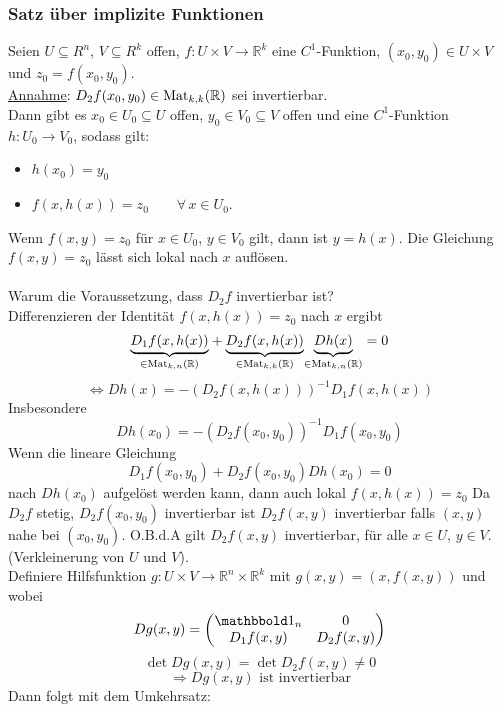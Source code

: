 \subsubsection{Satz über implizite Funktionen} %
\label{implfunkt}
 Seien $U \subseteq R^n$, $V \subseteq R^k$ offen, $f:U \times V \to \mathbb{R}^k$ eine $C^1$-Funktion, $(x_0,y_0) \in U \times V$ und $z_0 = f(x_0,y_0)$. \\
 \underline{Annahme}: $D_2f(x_0,y_0) \in \operatorname{Mat}_{k,k}(\mathbb{R})$ sei invertierbar. \\
 Dann gibt es $x_0 \in U_0 \subseteq U$ offen, $y_0 \in V_0 \subseteq V$ offen und eine $C^1$-Funktion $h: U_0 \to V_0$, sodass gilt:
 \begin{itemize}
 	\item $h(x_0)=y_0$
	\item $f(x,h(x))=z_0 \qquad \forall\, x \in U_0$.
 \end{itemize}
 Wenn $f(x,y)=z_0$ für $x \in U_0$, $y \in V_0$ gilt, dann ist $y=h(x)$.
Die Gleichung $f(x,y)=z_0$ lässt sich lokal nach $x$ auflösen. \\
\\
Warum die Voraussetzung, dass $D_2f$ invertierbar ist? \\
Differenzieren der Identität $f(x,h(x))=z_0$ nach $x$ ergibt
\[
	\underset{\in \operatorname{Mat}_{k,n}(\mathbb{R})}{\underbrace{D_1f(x,h(x))}}+ \underset{\in \operatorname{Mat}_{k,k}(\mathbb{R})}{\underbrace{D_2f(x,h(x))}}\underset{\in \operatorname{Mat}_{k,n}(\mathbb{R})}{\underbrace{Dh(x)}} = 0 
\]
\[
	\Leftrightarrow Dh(x) = - (D_2f(x,h(x)))^{-1}D_1f(x,h(x))
\]
Insbesondere 
\[
	Dh(x_0)= -(D_2f(x_0,y_0))^{-1} D_1f(x_0,y_0)
\]
Wenn die lineare Gleichung
\[
	D_1f(x_0,y_0)+D_2f(x_0,y_0)Dh(x_0)=0
\]
nach $Dh(x_0)$ aufgelöst werden kann, dann auch lokal $f(x,h(x))=z_0$
Da $D_2f$ stetig, $D_2f(x_0,y_0)$ invertierbar ist $D_2f(x,y)$ invertierbar falls $(x,y)$ nahe bei $(x_0,y_0)$. O.B.d.A gilt $D_2f(x,y)$ invertierbar, für alle $x \in U$, $y \in V$. (Verkleinerung von $U$ und $V$). \\
Definiere Hilfsfunktion $g: U \times V \to \mathbb{R}^n \times \mathbb{R}^k$ mit $g(x,y)=(x,f(x,y))$ und wobei
\[
	Dg(x,y)= \begin{pmatrix}
	 \ind_n & 0  \\
	 D_1f(x,y) & D_2f(x,y) \\
	 	\end{pmatrix}
\] 
\[
	\det Dg(x,y) = \det D_2f(x,y) \neq 0
\]
\[
	\Rightarrow Dg(x,y) \text{ ist invertierbar}
\]
Dann folgt mit dem Umkehrsatz:
